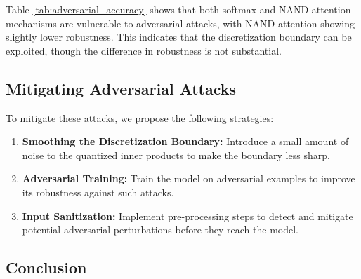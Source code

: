 Table \ref{tab:adversarial_accuracy} shows that both softmax and NAND attention mechanisms are vulnerable to adversarial attacks, with NAND attention showing slightly lower robustness. This indicates that the discretization boundary can be exploited, though the difference in robustness is not substantial.













\subsection{Mitigating Adversarial Attacks}






To mitigate these attacks, we propose the following strategies:






\begin{enumerate}






    \item \textbf{Smoothing the Discretization Boundary:} Introduce a small amount of noise to the quantized inner products to make the boundary less sharp.






    \item \textbf{Adversarial Training:} Train the model on adversarial examples to improve its robustness against such attacks.






    \item \textbf{Input Sanitization:} Implement pre-processing steps to detect and mitigate potential adversarial perturbations before they reach the model.






\end{enumerate}













\subsection{Conclusion}






